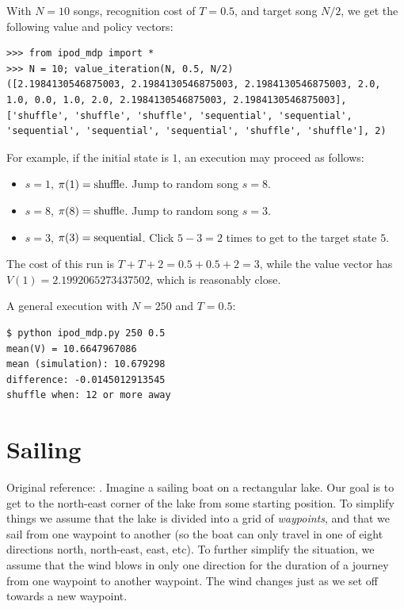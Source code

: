 \documentclass[10pt,amstags,fleqn]{article}
\theoremstyle{plain}
\theoremstyle{definition}
\theoremstyle{definition}
\begin{document}
With $N = 10$ songs, recognition cost of $T = 0.5$, and target song
$N/2$, we get the following value and policy vectors:

\begin{Verbatim}
>>> from ipod_mdp import *
>>> N = 10; value_iteration(N, 0.5, N/2)
([2.1984130546875003, 2.1984130546875003, 2.1984130546875003, 2.0, 
1.0, 0.0, 1.0, 2.0, 2.1984130546875003, 2.1984130546875003], 
['shuffle', 'shuffle', 'shuffle', 'sequential', 'sequential', 
'sequential', 'sequential', 'sequential', 'shuffle', 'shuffle'], 2)
\end{Verbatim}

For example, if the initial state is $1$, an execution may proceed as
follows:

\begin{itemize}

\item $s = 1$, $\pi(1) = \textnormal{shuffle}$. Jump to random song $s = 8$.
\item $s = 8$, $\pi(8) = \textnormal{shuffle}$. Jump to random song $s = 3$.
\item $s = 3$, $\pi(3) = \textnormal{sequential}$. Click $5-3 = 2$ times
to get to the target state $5$. 
\end{itemize}
The cost of this run is $T + T + 2 = 0.5 + 0.5 + 2 = 3$, while the value
vector has $V(1) = 2.1992065273437502$, which is reasonably close. 

A general execution with $N = 250$ and $T = 0.5$:

\begin{Verbatim}
$ python ipod_mdp.py 250 0.5
mean(V) = 10.6647967086
mean (simulation): 10.679298
difference: -0.0145012913545
shuffle when: 12 or more away
\end{Verbatim}

\section{Sailing}

Original reference: \cite{sail}. Imagine a sailing boat on a rectangular lake. Our goal is to get to the
north-east corner of the lake from some starting position. To simplify
things we assume that the lake is divided into a grid of {\em
waypoints}, and that we sail from one waypoint to another (so the boat
can only travel in one of eight directions north, north-east, east,
etc). To further simplify the situation, we assume that the wind blows
in only one direction for the duration of a journey from one waypoint to
another waypoint. The wind changes just as we set off towards a new
waypoint.
\end{document}
